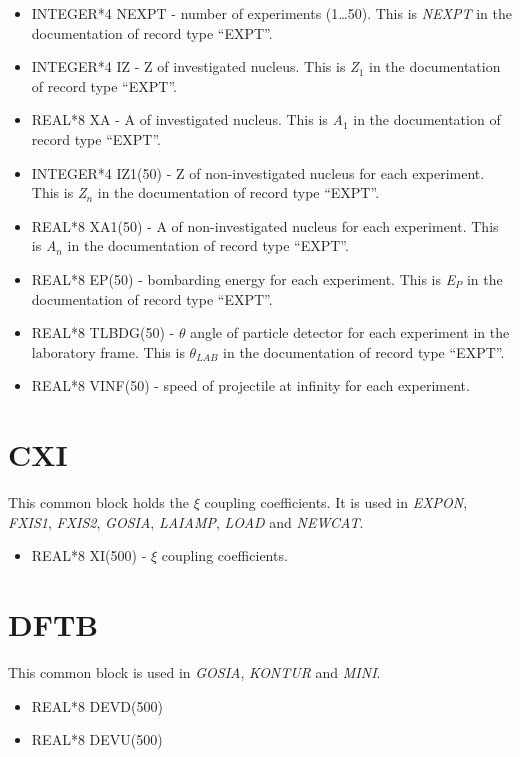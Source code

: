 \begin{itemize}
\item INTEGER*4 NEXPT - number of experiments (1{\ldots}50). This is {\em
NEXPT} in the documentation of record type ``EXPT''.
\item INTEGER*4 IZ - Z of investigated nucleus. This is {\em Z$_1$} in the
documentation of record type ``EXPT''.
\item REAL*8 XA - A of investigated nucleus. This is {\em A$_1$} in the
documentation of record type ``EXPT''.
\item INTEGER*4 IZ1(50) - Z of non-investigated nucleus for each experiment.
This is {\em Z$_n$} in the documentation of record type ``EXPT''.
\item REAL*8 XA1(50) - A of non-investigated nucleus for each experiment.
This is {\em A$_n$} in the documentation of record type ``EXPT''.
\item REAL*8 EP(50) - bombarding energy for each experiment. This is {\em
E$_P$} in the documentation of record type ``EXPT''.
\item REAL*8 TLBDG(50) - $\theta$ angle of particle detector for each
experiment in the laboratory frame. This is {\em $\theta_{LAB}$} in the
documentation of record type ``EXPT''.
\item REAL*8 VINF(50) - speed of projectile at infinity for each experiment.
\end{itemize}

\section{CXI}

This common block holds the $\xi$ coupling coefficients. It is used in {\em
EXPON}, {\em FXIS1}, {\em FXIS2}, {\em GOSIA}, {\em LAIAMP}, {\em LOAD} and
{\em NEWCAT}.

\begin{itemize}
\item REAL*8 XI(500) - $\xi$ coupling coefficients.
\end{itemize}

\section{DFTB}

This common block is used in {\em GOSIA}, {\em KONTUR} and {\em MINI}.

\begin{itemize}
\item REAL*8 DEVD(500)
\item REAL*8 DEVU(500)
\end{itemize}

